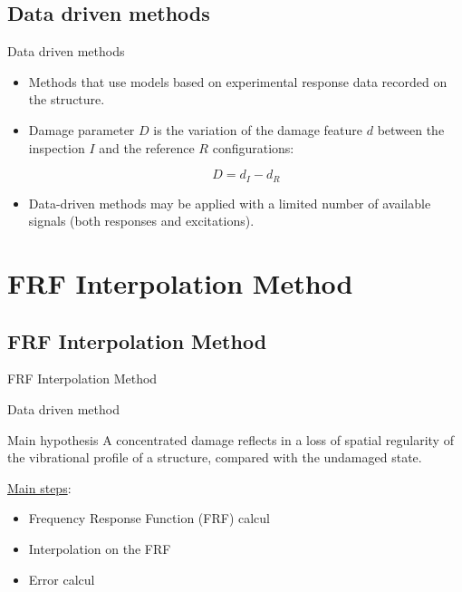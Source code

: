 \documentclass{beamer}
\begin{document}
\subsection{Data driven methods}
\begin{frame}{Data driven methods}
\begin{center}
\begin{itemize}
\item Methods that use models based on experimental response data recorded on the structure.

\vspace{1\baselineskip}
\item Damage parameter $D$ is the variation of the damage feature $d$ between
the inspection $I$ and the reference $R$ configurations:

\begin{equation}
D=d_{I} - d_{R}
\end{equation}
\item Data-driven methods may be applied with a limited number of available signals (both
responses and excitations).
\end{itemize}
\end{center}


\end{frame}




\section{FRF Interpolation Method}

\subsection{FRF Interpolation Method}
\begin{frame}{FRF Interpolation Method}

\begin{center}
Data driven method
\end{center}

\pause

\begin{alertblock}{Main hypothesis}
A concentrated damage reflects
in a loss of spatial regularity of the vibrational profile of a
structure, compared with the undamaged state.
\end{alertblock}

\pause

\underline{Main steps}:
\begin{itemize}
\item Frequency Response Function (FRF) calcul
\item Interpolation on the FRF
\item Error calcul
\end{itemize}


\end{frame}
\end{document}
